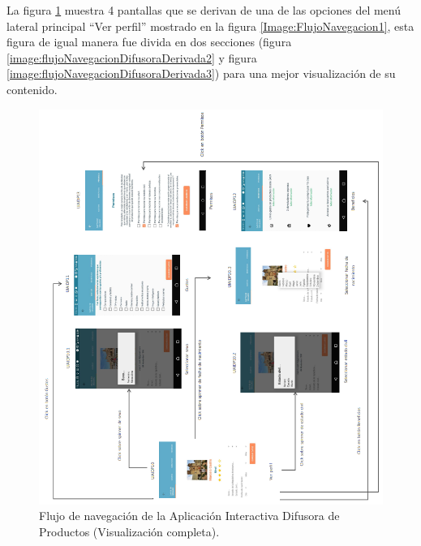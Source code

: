 La figura \ref{image:flujoNavegacionDifusoraDerivada1} muestra 4 pantallas que se derivan de una de las opciones del menú lateral principal ``Ver perfil'' mostrado en la figura \ref{Image:FlujoNavegacion1}, esta figura de igual manera fue divida en dos secciones (figura \ref{image:flujoNavegacionDifusoraDerivada2} y figura \ref{image:flujoNavegacionDifusoraDerivada3}) para una mejor visualización de su contenido.
\FloatBarrier
\begin{figure}[htbp!]
		\centering
			\includegraphics[width=1 \textwidth]{imagenes/UI_userapp/mapaNav2H}
		\caption{Flujo de navegación de la Aplicación Interactiva Difusora de Productos (Visualización completa).}
		\label{image:flujoNavegacionDifusoraDerivada1}		
\end{figure}
\FloatBarrier

